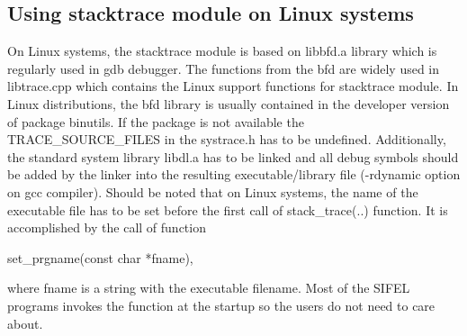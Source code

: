 \subsection {Using stacktrace module on Linux systems}
On Linux systems, the stacktrace module is based on {\sf libbfd.a} library which is regularly used in {\sf gdb} 
debugger. The functions from the {\sf bfd}  are widely used in {\sf libtrace.cpp} which contains the Linux support
functions for stacktrace module. In Linux distributions, the {\sf bfd} library is usually contained in the developer 
version of package {\sf binutils}. If the package is not available the {\sf TRACE\_SOURCE\_FILES} in the {\sf systrace.h} 
has to be undefined. Additionally, the standard system library {\sf libdl.a} has to be linked and all debug symbols 
should be added by the linker into the resulting executable/library file ({\sf -rdynamic} option on {\sf gcc} compiler).
Should be noted that on Linux systems, the name of the executable file has to be set before the first call 
of {\sf stack\_trace(..)} function. It is accomplished by the call of function

\begin{center}
{\sf set\_prgname(const char *fname)},
\end{center}
where {\sf fname} is a string with the executable filename. Most of the SIFEL programs invokes the function 
at the startup so the users do not need to care about.

